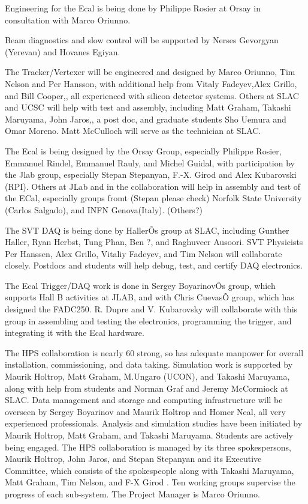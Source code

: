 Engineering for the Ecal is being done by Philippe Rosier at Orsay in consultation with Marco Oriunno. 

Beam diagnostics and slow control will be supported by Nerses Gevorgyan (Yerevan) and Hovanes Egiyan.

 
The Tracker/Vertexer will be engineered and designed by Marco Oriunno, Tim Nelson and Per Hansson, with additional help from Vitaly Fadeyev,Alex Grillo, and Bill Cooper,, all experienced with silicon detector systems. Others at SLAC and UCSC will help with test and assembly, including Matt Graham, Takashi Maruyama, John Jaros,, a post doc, and graduate students Sho Uemura and Omar Moreno.  Matt McCulloch will serve as the  technician at SLAC. 

The Ecal is being designed by the Orsay Group, especially Philippe Rosier, Emmanuel Rindel, Emmanuel Rauly, and Michel Guidal, with participation by the Jlab group, especially Stepan Stepanyan, F.-X. Girod and Alex Kubarovski (RPI). Others at JLab and in the collaboration will help in assembly and test of the ECal, especially groups fromt (Stepan please check) Norfolk State University (Carlos Salgado), and INFN Genova(Italy). (Others?)
 
The SVT DAQ is being done by HallerÕs group at SLAC, including Gunther Haller, Ryan Herbst, Tung Phan, Ben ?, and Raghuveer Ausoori. SVT Physicists Per Hanssen, Alex Grillo, Vitaliy Fadeyev, and Tim Nelson will collaborate closely. Postdocs and students will help debug, test, and certify DAQ electronics. 

The Ecal Trigger/DAQ work is done in Sergey BoyarinovÕs group, which supports Hall B activities at JLAB, and with Chris CuevasÕ group, which has designed the FADC250. R. Dupre and V. Kubarovsky will collaborate with this group in assembling and testing the electronics, programming the trigger, and integrating it with the Ecal hardware.

 The HPS collaboration is nearly 60 strong, so has adequate manpower for overall installation, commissioning, and data taking.  Simulation work is supported by Maurik Holtrop, Matt Graham, M.Ungaro (UCON), and Takashi Maruyama, along with help from students and Norman Graf  and Jeremy McCormiock at SLAC. Data management and storage and computing infrastructure will be overseen by Sergey Boyarinov and Maurik Holtrop and Homer Neal, all very experienced professionals. Analysis and simulation studies have been initiated by Maurik Holtrop, Matt Graham, and Takashi Maruyama. Students are actively being engaged. 
The HPS collaboration is managed by its three spokespersons, Maurik Holtrop, John Jaros, and Stepan Stepanyan and its Executive Committee, which consists of the spokespeople along with Takashi Maruyama, Matt Graham, Tim Nelson, and F-X Girod . Ten working groups supervise the progress of each sub-system. The Project Manager is Marco Oriunno.

